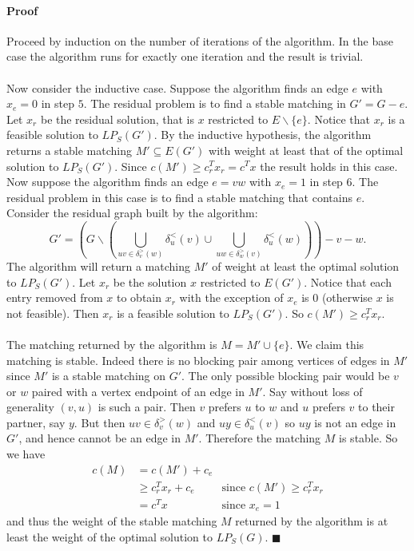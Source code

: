 \documentclass[letterpaper,12pt,oneside,onecolumn]{article}
\begin{document}
\paragraph{Proof}
Proceed by induction on the number of iterations of the algorithm. In the base case the algorithm runs for exactly one iteration and the result is trivial.
\paragraph{}
Now consider the inductive case. Suppose the algorithm finds an edge $e$ with $x_e = 0$ in step $5$. The residual problem is to find a stable matching in $G' = G - e$. Let $x_r$ be the residual solution, that is $x$ restricted to $E \backslash \{e\}$. Notice that $x_r$ is a feasible solution to $LP_S(G')$. By the inductive hypothesis, the algorithm returns a stable matching $M' \subseteq E(G')$ with weight at least that of the optimal solution to $LP_S(G')$. Since $c(M') \geq c^T_rx_r = c^Tx$ the result holds in this case.
Now suppose the algorithm finds an edge $e=vw$ with $x_e = 1$ in step $6$. The residual problem in this case is to find a stable matching that contains $e$. Consider the residual graph built by the algorithm:
$$ G' = (G\backslash(\bigcup_{uv \in \delta_v^>(w)}\delta_u^<(v) \cup \bigcup_{uw \in \delta_w^>(v)} \delta_u^<(w) ))- v - w.$$
The algorithm will return a matching $M'$ of weight at least the optimal solution to $LP_S(G')$. Let $x_r$ be the solution $x$ restricted to $E(G')$. Notice that each entry removed from $x$ to obtain $x_r$ with the exception of $x_e$ is $0$ (otherwise $x$ is not feasible). Then $x_r$ is a feasible solution to $LP_S(G')$. So $c(M') \geq c^T_rx_r$. 
\paragraph{}
The matching returned by the algorithm is $M = M' \cup \{e\}$. We claim this matching is stable. Indeed there is no blocking pair among vertices of edges in $M'$ since $M'$ is a stable matching on $G'$. The only possible blocking pair would be $v$ or $w$ paired with a vertex endpoint of an edge in $M'$. Say without loss of generality $(v, u)$ is such a pair. Then $v$ prefers $u$ to $w$ and $u$ prefers $v$ to their partner, say $y$. But then $uv \in \delta_v^>(w)$ and $uy \in \delta_u^<(v)$ so $uy$ is not an edge in $G'$, and hence cannot be an edge in $M'$. Therefore the matching $M$ is stable. So we have
\begin{align*}
c(M) &= c(M') + c_e \\
&\geq c^T_rx_r + c_e &\text{since $c(M') \geq c^T_rx_r$}\\
&= c^Tx &\text{since $x_e = 1$}
\end{align*} 
and thus the weight of the stable matching $M$ returned by the algorithm is at least the weight of the optimal solution to $LP_S(G)$. $\blacksquare$
\end{document}
